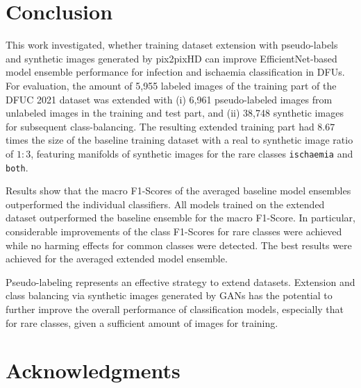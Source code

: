 \documentclass[runningheads]{llncs}
\begin{document}

\section{Conclusion} %
\label{sec:conclusion}

This work investigated, whether training dataset extension with pseudo-labels and synthetic images generated by pix2pixHD can improve EfficientNet-based model ensemble performance for infection and ischaemia classification in DFUs. For evaluation, the amount of 5,955 labeled images of the training part of the DFUC 2021 dataset was extended with (i) 6,961 pseudo-labeled images from unlabeled images in the training and test part, and (ii) 38,748 synthetic images for subsequent class-balancing. The resulting extended training part had $8.67$ times the size of the baseline training dataset with a real to synthetic image ratio of $1:3$, featuring manifolds of synthetic images for the rare classes \texttt{ischaemia} and \texttt{both}.

Results show that the macro F1-Scores of the averaged baseline model ensembles outperformed the individual classifiers. All models trained on the extended dataset outperformed the baseline ensemble for the macro F1-Score. In particular, considerable improvements of the class F1-Scores for rare classes were achieved while no harming effects for common classes were detected. The best results were achieved for the averaged extended model ensemble.

Pseudo-labeling represents an effective strategy to extend datasets. Extension and class balancing via synthetic images generated by GANs has the potential to further improve the overall performance of classification models, especially that for rare classes, given a sufficient amount of images for training.


\section*{Acknowledgments}
\end{document}
